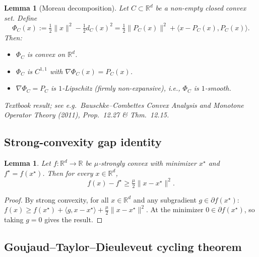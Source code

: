 \documentclass[11pt]{article}
\newtheorem{lemma}[theorem]{Lemma}
\theoremstyle{definition}
\theoremstyle{remark}
\begin{document}
\begin{lemma}[Moreau decomposition]
\label{lem:moreau}
Let $C \subset \mathbb{R}^d$ be a non-empty closed convex set. Define
\[
  \Phi_C(x) := \tfrac{1}{2}\|x\|^2 - \tfrac{1}{2} d_C(x)^2 = \tfrac{1}{2}\|P_C(x)\|^2 + \langle x - P_C(x), P_C(x)\rangle.
\]
Then:
\begin{itemize}
\item $\Phi_C$ is convex on $\mathbb{R}^d$.
\item $\Phi_C$ is $C^{1,1}$ with $\nabla \Phi_C(x) = P_C(x)$.
\item $\nabla \Phi_C = P_C$ is $1$-Lipschitz (firmly non-expansive), i.e., $\Phi_C$ is $1$-smooth.
\end{itemize}
\end{lemma}

\textit{Textbook result; see e.g.\ Bauschke--Combettes \emph{Convex Analysis and Monotone Operator Theory} (2011), Prop.~12.27 \& Thm.~12.15.}

\subsection{Strong-convexity gap identity}

\begin{lemma}
\label{lem:sc-gap}
Let $f : \mathbb{R}^d \to \mathbb{R}$ be $\mu$-strongly convex with minimizer $x^\star$ and $f^\star = f(x^\star)$. Then for every $x \in \mathbb{R}^d$,
\[
  f(x) - f^\star \geq \tfrac{\mu}{2}\|x - x^\star\|^2.
\]
\end{lemma}

\begin{proof}
By strong convexity, for all $x \in \mathbb{R}^d$ and any subgradient $g \in \partial f(x^\star)$: $f(x) \geq f(x^\star) + \langle g, x - x^\star\rangle + \tfrac{\mu}{2}\|x - x^\star\|^2$. At the minimizer $0 \in \partial f(x^\star)$, so taking $g = 0$ gives the result.
\end{proof}

\subsection{Goujaud--Taylor--Dieuleveut cycling theorem}
\end{document}

